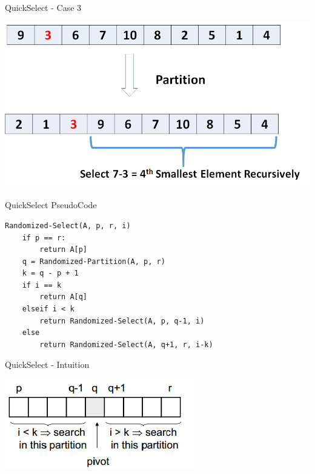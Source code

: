 \documentclass{beamer}
\begin{document}
\begin{frame}{QuickSelect - Case 3}
\begin{center}
    \includegraphics[scale=0.4]{quickSelectCase3.png}
\end{center}
\end{frame}

\begin{frame}[fragile]{QuickSelect PseudoCode}
\begin{verbatim}
Randomized-Select(A, p, r, i)
    if p == r:
        return A[p]
    q = Randomized-Partition(A, p, r)
    k = q - p + 1
    if i == k
        return A[q]
    elseif i < k
        return Randomized-Select(A, p, q-1, i)
    else
        return Randomized-Select(A, q+1, r, i-k)
\end{verbatim}
\end{frame}


\begin{frame}{QuickSelect - Intuition}
\begin{center}
    \includegraphics[scale=0.7]{quickSelectSummary.png}
\end{center}
\end{frame}
\end{document}
